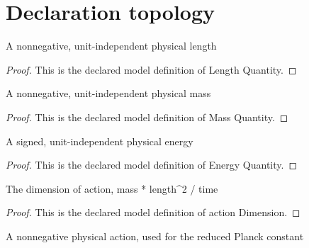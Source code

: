 \section{Declaration topology}
\begin{definition}
  \label{def:physics:phyx-mini-0615:phyxminiproblems-problemphyxmini0615-lengthquantity}
  A nonnegative, unit-independent physical length
\end{definition}
\begin{proof}
  This is the declared model definition of Length Quantity.
\end{proof}
\begin{definition}
  \label{def:physics:phyx-mini-0615:phyxminiproblems-problemphyxmini0615-massquantity}
  A nonnegative, unit-independent physical mass
\end{definition}
\begin{proof}
  This is the declared model definition of Mass Quantity.
\end{proof}
\begin{definition}
  \label{def:physics:phyx-mini-0615:phyxminiproblems-problemphyxmini0615-energyquantity}
  A signed, unit-independent physical energy
\end{definition}
\begin{proof}
  This is the declared model definition of Energy Quantity.
\end{proof}
\begin{definition}
  \label{def:physics:phyx-mini-0615:phyxminiproblems-problemphyxmini0615-actiondimension}
  The dimension of action, mass * length\textasciicircum{}2 / time
\end{definition}
\begin{proof}
  This is the declared model definition of action Dimension.
\end{proof}
\begin{definition}
  \label{def:physics:phyx-mini-0615:phyxminiproblems-problemphyxmini0615-actionquantity}
  A nonnegative physical action, used for the reduced Planck constant
\end{definition}
